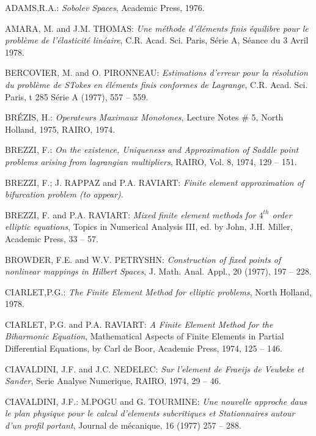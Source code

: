 \begin{thebibliography}{99}
 ADAMS,\pageoriginale R.A.: \emph{Sobolev Spaces},
Academic Press, 1976.

 AMARA, M. and J.M. THOMAS: \emph{Une m\'ethode
  d'\'el\'ements finis \'equilibre pour le probl\`eme de
  l'\'elasticit\'e lin\'eaire}, C.R. Acad. Sci. Paris, S\'erie A,
  S\'eance du 3 Avril 1978.

 BERCOVIER, M. and O. PIRONNEAU: \emph{Estimations d'erreur
  pour la r\'esolution du probl\`eme de STokes en \'el\'ements finis
  conformes de Lagrange}, C.R. Acad. Sci. Paris, t 285 S\'erie A
  (1977), 557 -- 559.

 BR\'EZIS, H.: \emph{Operateurs Maximaux Monotones},
  Lecture Notes \# 5, North Holland, 1975, RAIRO, 1974.

 BREZZI, F.: \emph{On the existence, Uniqueness and
  Approximation of Saddle point problems arising from lagrangian
  multipliers}, RAIRO, Vol. 8, 1974, 129 -- 151.

 BREZZI, F.; J. RAPPAZ and P.A. RAVIART: \emph{Finite
  element approximation of bifurcation problem (to appear)}.

 BREZZI, F. and P.A. RAVIART: \emph{Mixed finite element
  methods for $4^{th}$ order elliptic equations}, Topics in Numerical
  Analysis III, ed. by John, J.H. Miller, Academic Press, 33 -- 57.

 BROWDER, F.E. and W.V. PETRYSHN: \emph{Construction of
  fixed points of nonlinear mappings in Hilbert Spaces},
  J. Math. Anal. Appl., 20 (1977), 197 -- 228.

 CIARLET,\pageoriginale P.G.: \emph{The Finite Element Method 
for elliptic problems}, North Holland, 1978.

 CIARLET, P.G. and P.A. RAVIART: \emph{A Finite Element
  Method for the Biharmonic Equation}, Mathematical Aspects of Finite
  Elements in Partial Differential Equations, by Carl de Boor,
  Academic Press, 1974, 125 -- 146.

 CIAVALDINI, J.F. and J.C. NEDELEC: \emph{Sur l'element
  de Fraeijs de Veubeke et Sander}, Serie Analyse Numerique, RAIRO,
  1974, 29 -- 46.

 CIAVALDINI, J.F.: M.POGU and G. TOURMINE: \emph{Une
  nouvelle approche daus le plan physique pour le calcul d'elements
  subcritiques et Stationnaires autour d'un profil portant}, Journal
  de m\'ecanique, 16 (1977) 257 -- 288.


\end{thebibliography}
